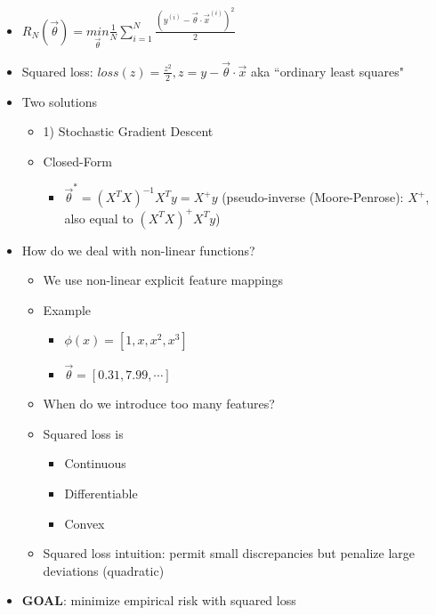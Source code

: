 \documentclass[10pt, oneside]{article}
\begin{document}
\begin{itemize}
    \item $R_N(\vec \theta) = \underset{\vec \theta}{min} \frac{1}{N}\sum_{i=1}^N \frac{(y^{(i)} - \vec \theta \cdot \vec x^{(i)})^2}{2}$
    \item Squared loss: $loss(z)=\frac{z^2}{2}, z=y-\vec \theta \cdot \vec x$ aka ``ordinary least squares"
    \item Two solutions
    \begin{itemize}
        \item 1) Stochastic Gradient Descent
        \item Closed-Form
        \begin{itemize}
            \item $\vec \theta^*=(X^TX)^{-1} X^T y = X^+y$ (pseudo-inverse (Moore-Penrose): $X^+$, also equal to $(X^T X)^+ X^T y$)
        \end{itemize}
    \end{itemize}
    \item How do we deal with non-linear functions?
    \begin{itemize}
        \item We use non-linear explicit feature mappings
        \item Example
        \begin{itemize}
            \item $\phi(x) = [1,x,x^2, x^3]$
            \item $\vec \theta = [0.31, 7.99,\cdots]$
        \end{itemize}
        \item When do we introduce too many features?
    \end{itemize}
    \begin{itemize}
        \item Squared loss is 
        \begin{itemize}
            \item Continuous
            \item Differentiable
            \item Convex
        \end{itemize}
        \item Squared loss intuition: permit small discrepancies but penalize large deviations (quadratic)
    \end{itemize}
    \item \textbf{GOAL}: minimize empirical risk with squared loss
    \begin{itemize}

\end{itemize}
\end{itemize}
\end{document}
